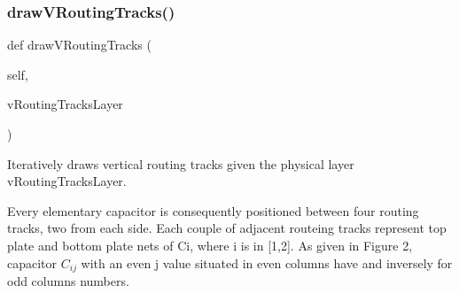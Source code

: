 \subsubsection{\texorpdfstring{draw\+V\+Routing\+Tracks()}{drawVRoutingTracks()}}
{\footnotesize\ttfamily def draw\+V\+Routing\+Tracks (\begin{DoxyParamCaption}\item[{}]{self,  }\item[{}]{v\+Routing\+Tracks\+Layer }\end{DoxyParamCaption})}



Iteratively draws vertical routing tracks given the physical layer {\ttfamily v\+Routing\+Tracks\+Layer}. 

Every elementary capacitor is consequently positioned between four routing tracks, two from each side. Each couple of adjacent routeing tracks represent top plate and bottom plate nets of Ci, where i is in \mbox{[}1,2\mbox{]}. As given in Figure 2, capacitor $ C_{ij} $ with an even j value situated in even columns have and inversely for odd columns numbers. 


